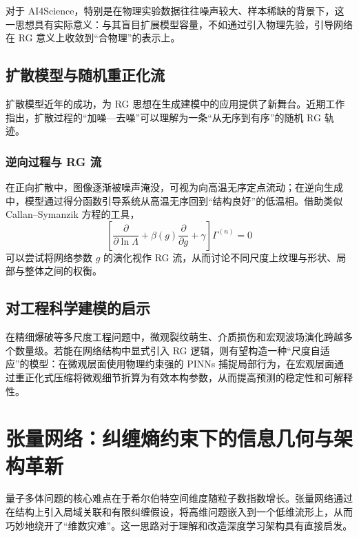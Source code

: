 \documentclass[12pt,a4paper]{article}
\begin{document}
对于 AI4Science，特别是在物理实验数据往往噪声较大、样本稀缺的背景下，这一思想具有实际意义：与其盲目扩展模型容量，不如通过引入物理先验，引导网络在 RG 意义上收敛到“合物理”的表示上。

\subsection{扩散模型与随机重正化流}

扩散模型近年的成功，为 RG 思想在生成建模中的应用提供了新舞台。近期工作\cite{hu2024learning, chen2025diffusion} 指出，扩散过程的“加噪—去噪”可以理解为一条“从无序到有序”的随机 RG 轨迹。

\subsubsection{逆向过程与 RG 流}

在正向扩散中，图像逐渐被噪声淹没，可视为向高温无序定点流动；在逆向生成中，模型通过得分函数引导系统从高温无序回到“结构良好”的低温相。借助类似 Callan–Symanzik 方程的工具，
\begin{equation}
    \left[ \frac{\partial}{\partial \ln \Lambda} + \beta(g) \frac{\partial}{\partial g} + \gamma \right] \Gamma^{(n)} = 0
\end{equation}
可以尝试将网络参数 $g$ 的演化视作 RG 流，从而讨论不同尺度上纹理与形状、局部与整体之间的权衡。

\subsection{对工程科学建模的启示}

在精细爆破等多尺度工程问题中，微观裂纹萌生、介质损伤和宏观波场演化跨越多个数量级。若能在网络结构中显式引入 RG 逻辑，则有望构造一种“尺度自适应”的模型：在微观层面使用物理约束强的 PINNs\cite{raissi2019physics} 捕捉局部行为，在宏观层面通过重正化式压缩将微观细节折算为有效本构参数，从而提高预测的稳定性和可解释性。

\section{张量网络：纠缠熵约束下的信息几何与架构革新}

量子多体问题的核心难点在于希尔伯特空间维度随粒子数指数增长。张量网络通过在结构上引入局域关联和有限纠缠假设，将高维问题嵌入到一个低维流形上，从而巧妙地绕开了“维数灾难”。这一思路对于理解和改造深度学习架构具有直接启发。
\end{document}
